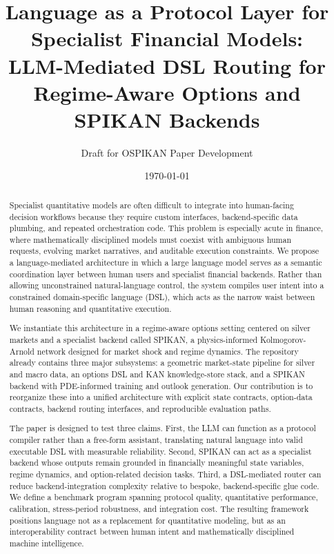 \documentclass[11pt]{article}
\title{Language as a Protocol Layer for Specialist Financial Models:\\
LLM-Mediated DSL Routing for Regime-Aware Options and SPIKAN Backends}
\author{Draft for OSPIKAN Paper Development}
\date{\today}
\begin{document}
\maketitle

\begin{abstract}
Specialist quantitative models are often difficult to integrate into human-facing
decision workflows because they require custom interfaces, backend-specific data
plumbing, and repeated orchestration code. This problem is especially acute in
finance, where mathematically disciplined models must coexist with ambiguous
human requests, evolving market narratives, and auditable execution constraints.
We propose a language-mediated architecture in which a large language model
serves as a semantic coordination layer between human users and specialist
financial backends. Rather than allowing unconstrained natural-language control,
the system compiles user intent into a constrained domain-specific language
(DSL), which acts as the narrow waist between human reasoning and quantitative
execution.

We instantiate this architecture in a regime-aware options setting centered on
silver markets and a specialist backend called SPIKAN, a physics-informed
Kolmogorov-Arnold network designed for market shock and regime dynamics. The
repository already contains three major subsystems: a geometric market-state
pipeline for silver and macro data, an options DSL and KAN knowledge-store
stack, and a SPIKAN backend with PDE-informed training and outlook generation.
Our contribution is to reorganize these into a unified architecture with
explicit state contracts, option-data contracts, backend routing interfaces, and
reproducible evaluation paths.

The paper is designed to test three claims. First, the LLM can function as a
protocol compiler rather than a free-form assistant, translating natural
language into valid executable DSL with measurable reliability. Second, SPIKAN
can act as a specialist backend whose outputs remain grounded in financially
meaningful state variables, regime dynamics, and option-related decision tasks.
Third, a DSL-mediated router can reduce backend-integration complexity relative
to bespoke, backend-specific glue code. We define a benchmark program spanning
protocol quality, quantitative performance, calibration, stress-period
robustness, and integration cost. The resulting framework positions language not
as a replacement for quantitative modeling, but as an interoperability contract
between human intent and mathematically disciplined machine intelligence.
\end{abstract}
\end{document}
